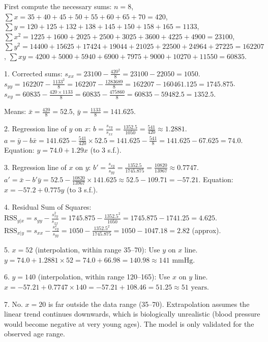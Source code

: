 \documentclass[11pt]{article}
\begin{document}
\begin{corrige}[Exercise]
First compute the necessary sums:
$n=8$,
$\sum x = 35+40+45+50+55+60+65+70 = 420$,
$\sum y = 120+125+132+138+145+150+158+165 = 1133$,
$\sum x^2 = 1225+1600+2025+2500+3025+3600+4225+4900 = 23100$,
$\sum y^2 = 14400+15625+17424+19044+21025+22500+24964+27225 = 162207$,
$\sum xy = 4200+5000+5940+6900+7975+9000+10270+11550 = 60835$.

1. Corrected sums:
$s_{xx} = 23100 - \frac{420^2}{8} = 23100 - 22050 = 1050$.
$s_{yy} = 162207 - \frac{1133^2}{8} = 162207 - \frac{1283689}{8} = 162207 - 160461.125 = 1745.875$.
$s_{xy} = 60835 - \frac{420 \times 1133}{8} = 60835 - \frac{475860}{8} = 60835 - 59482.5 = 1352.5$.

Means: $\bar{x} = \frac{420}{8} = 52.5$, $\bar{y} = \frac{1133}{8} = 141.625$.

2. Regression line of $y$ on $x$:
$b = \frac{s_{xy}}{s_{xx}} = \frac{1352.5}{1050} = \frac{541}{420} \approx 1.2881$.
$a = \bar{y} - b\bar{x} = 141.625 - \frac{541}{420} \times 52.5 = 141.625 - \frac{541}{8} = 141.625 - 67.625 = 74.0$.
Equation: $\boxed{y = 74.0 + 1.29x}$ (to 3 s.f.).

3. Regression line of $x$ on $y$:
$b' = \frac{s_{xy}}{s_{yy}} = \frac{1352.5}{1745.875} = \frac{10820}{13967} \approx 0.7747$.
$a' = \bar{x} - b'\bar{y} = 52.5 - \frac{10820}{13967} \times 141.625 \approx 52.5 - 109.71 = -57.21$.
Equation: $\boxed{x = -57.2 + 0.775y}$ (to 3 s.f.).

4. Residual Sum of Squares:
$\mathrm{RSS}_{y|x} = s_{yy} - \frac{s_{xy}^2}{s_{xx}} = 1745.875 - \frac{1352.5^2}{1050} = 1745.875 - 1741.25 = 4.625$.
$\mathrm{RSS}_{x|y} = s_{xx} - \frac{s_{xy}^2}{s_{yy}} = 1050 - \frac{1352.5^2}{1745.875} = 1050 - 1047.18 = 2.82$ (approx).

5. $x=52$ (interpolation, within range 35--70): Use $y$ on $x$ line.
$y = 74.0 + 1.2881 \times 52 = 74.0 + 66.98 = 140.98 \approx \boxed{141 \text{ mmHg}}$.

6. $y=140$ (interpolation, within range 120--165): Use $x$ on $y$ line.
$x = -57.21 + 0.7747 \times 140 = -57.21 + 108.46 = 51.25 \approx \boxed{51 \text{ years}}$.

7. No. $x=20$ is far outside the data range (35--70). Extrapolation assumes the linear trend continues downwards, which is biologically unrealistic (blood pressure would become negative at very young ages). The model is only validated for the observed age range.
\end{corrige}
\end{document}
